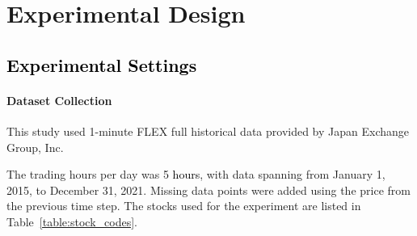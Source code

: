 \documentclass{article}
\newcommand{\takehiro}[1]{\textcolor{black}{#1}}
\begin{document}
\section{Experimental Design}

\subsection{\takehiro{Experimental Settings}}

\paragraph{Dataset Collection}


This study used 1-minute FLEX full historical data provided by Japan Exchange Group, Inc. 

The trading hours per day was 5 \takehiro{hours}, with data spanning from January 1, 2015, to December 31, 2021. Missing data points were added using the price from the previous time step. The stocks used for the experiment are listed in Table~\ref{table:stock_codes}.
\end{document}
